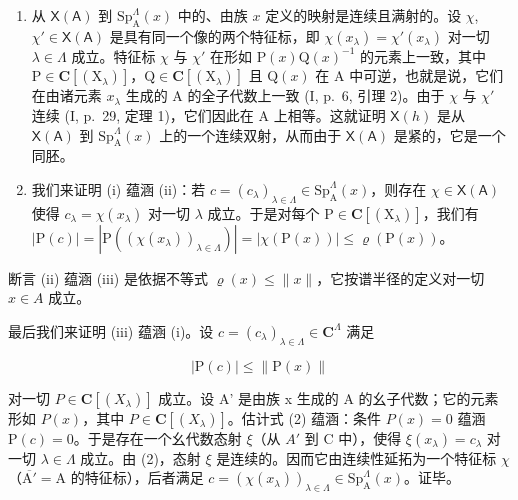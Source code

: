 \begin{enumerate}
\def\labelenumi{\alph{enumi})}
\item
  从 \(\mathsf{X}(\mathsf{A})\) 到 \(\mathrm{Sp}_{\mathrm{A}}^{\Lambda}(x)\) 中的、由族 \(x\) 定义的映射是连续且满射的。设 \(\chi\), \(\chi' \in \mathsf{X}(\mathsf{A})\) 是具有同一个像的两个特征标，即 \(\chi(x_{\lambda}) = \chi'(x_{\lambda})\) 对一切 \(\lambda \in \Lambda\) 成立。特征标 \(\chi\) 与 \(\chi'\) 在形如 \(\mathrm{P}(x)\mathrm{Q}(x)^{-1}\) 的元素上一致，其中 \(\mathrm{P} \in \mathbf{C}[(\mathrm{X}_{\lambda})]\)，\(\mathrm{Q} \in \mathbf{C}[(\mathrm{X}_{\lambda})]\) 且 \(\mathrm{Q}(x)\) 在 A 中可逆，也就是说，它们在由诸元素 \(x_{\lambda}\) 生成的 A 的全子代数上一致 (I, p.~6, 引理 2)。由于 \(\chi\) 与 \(\chi'\) 连续 (I, p.~29, 定理 1)，它们因此在 A 上相等。这就证明 \(\mathsf{X}(h)\) 是从 \(\mathsf{X}(\mathsf{A})\) 到 \(\mathrm{Sp}_{\mathrm{A}}^{\Lambda}(x)\) 上的一个连续双射，从而由于 \(\mathsf{X}(\mathsf{A})\) 是紧的，它是一个同胚。
\item
  我们来证明 (i) 蕴涵 (ii)：若 \(c = (c_{\lambda})_{\lambda \in \Lambda} \in \mathrm{Sp}_{\mathrm{A}}^{\Lambda}(x)\)，则存在 \(\chi \in \mathsf{X}(\mathsf{A})\) 使得 \(c_{\lambda} = \chi(x_{\lambda})\) 对一切 \(\lambda\) 成立。于是对每个 \(\mathrm{P} \in \mathbf{C}[(\mathrm{X}_{\lambda})]\)，我们有 \(|\mathrm{P}(c)| = |\mathrm{P}((\chi(x_{\lambda}))_{\lambda \in \Lambda})| = |\chi(\mathrm{P}(x))| \leqslant \varrho(\mathrm{P}(x))\)。
\end{enumerate}

断言 (ii) 蕴涵 (iii) 是依据不等式 \(\varrho(x) \leqslant \|x\|\)，它按谱半径的定义对一切 \(x \in A\) 成立。

最后我们来证明 (iii) 蕴涵 (i)。设 \(c = (c_{\lambda})_{\lambda \in \Lambda} \in \mathbf{C}^{\Lambda}\) 满足

\[
| \mathrm{P} (c) | \leqslant \| \mathrm{P} (x) \|\tag{2}
\]

对一切 \(P \in \mathbf{C}[(X_{\lambda})]\) 成立。设 A' 是由族 x 生成的 A 的幺子代数；它的元素形如 \(P(x)\)，其中 \(P \in \mathbf{C}[(X_{\lambda})]\)。估计式 (2) 蕴涵：条件 \(P(x) = 0\) 蕴涵 \(\mathrm{P}(c)=0\)。于是存在一个幺代数态射 \(\xi\)（从 \(A'\) 到 C 中），使得 \(\xi(x_{\lambda})=c_{\lambda}\) 对一切 \(\lambda\in\Lambda\) 成立。由 (2)，态射 \(\xi\) 是连续的。因而它由连续性延拓为一个特征标 \(\chi\)（\(\overline{\mathrm{A}'}=\mathrm{A}\) 的特征标），后者满足 \(c=(\chi(x_{\lambda}))_{\lambda\in\Lambda}\in\mathrm{Sp}_{\mathrm{A}}^{\Lambda}(x)\)。证毕。


